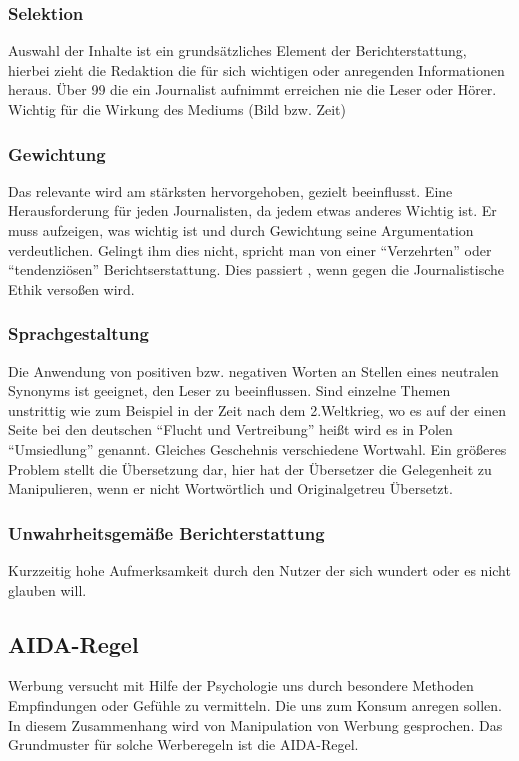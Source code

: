 \subsubsection{Selektion}
Auswahl der Inhalte ist ein grundsätzliches Element der Berichterstattung, hierbei zieht die
Redaktion die für sich wichtigen oder anregenden Informationen  heraus. Über 99%
die ein Journalist aufnimmt erreichen nie die Leser oder Hörer.
Wichtig für die Wirkung des Mediums (Bild bzw. Zeit)

\subsubsection{Gewichtung}
Das relevante wird am stärksten hervorgehoben, gezielt beeinflusst. Eine Herausforderung für jeden
Journalisten, da jedem etwas anderes Wichtig ist. Er muss aufzeigen, was wichtig ist und durch
Gewichtung seine Argumentation verdeutlichen.
Gelingt ihm dies nicht, spricht man von einer \enquote{Verzehrten} oder \enquote{tendenziösen} Berichtserstattung.
Dies passiert \zB, wenn gegen die Journalistische Ethik versoßen wird.

\subsubsection{Sprachgestaltung}
Die Anwendung von positiven bzw. negativen Worten an Stellen eines neutralen Synonyms ist geeignet,
den Leser zu beeinflussen. Sind einzelne Themen unstrittig wie zum Beispiel in der Zeit nach dem
2.Weltkrieg, wo es auf der einen Seite bei den deutschen \enquote{Flucht und Vertreibung} heißt wird es in
Polen \enquote{Umsiedlung} genannt. Gleiches Geschehnis verschiedene Wortwahl. Ein größeres Problem stellt
die Übersetzung dar, hier hat der Übersetzer die Gelegenheit zu Manipulieren, wenn er nicht
Wortwörtlich und Originalgetreu Übersetzt.

\subsubsection{Unwahrheitsgemäße Berichterstattung}
Kurzzeitig hohe Aufmerksamkeit durch den Nutzer der sich wundert oder es nicht glauben will.

\subsection{AIDA-Regel}
Werbung versucht mit Hilfe der Psychologie uns durch besondere Methoden Empfindungen oder Gefühle zu
vermitteln. Die uns zum Konsum anregen sollen. In diesem Zusammenhang wird von Manipulation von
Werbung gesprochen.
Das Grundmuster für solche Werberegeln ist die AIDA-Regel.

